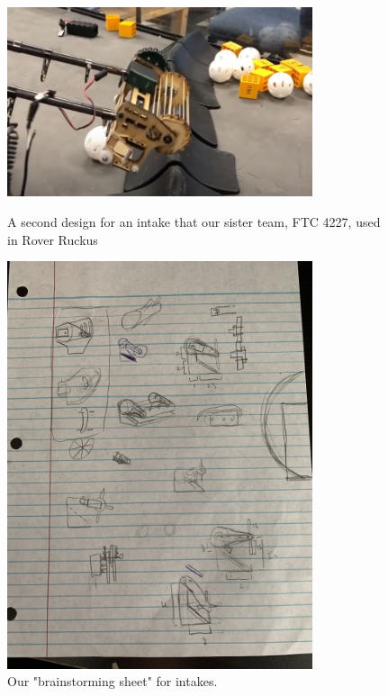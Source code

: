 \begin{figure}[ht]
\centering
\begin{minipage}[b]{.50\textwidth}
  \centering
  \includegraphics[width=0.8\textwidth]{Meetings/August/08-20-21/8-18-21_CAD_Image3 - Nathan Forrer.jpg}
  \caption{A second design for an intake that our sister team, FTC 4227, used in Rover Ruckus}
  \label{fig:pic3}
\end{minipage}%
\hfill%
\begin{minipage}[b]{.50\textwidth}
  \centering
  \includegraphics[width=0.8\textwidth]{Meetings/August/08-20-21/8-18-21_CAD_Image4 - Nathan Forrer.jpg}
  \caption{Our "brainstorming sheet" for intakes.}
  \label{fig:pic4}
\end{minipage}
\end{figure}

